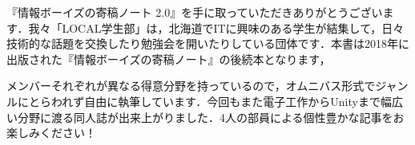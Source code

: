 『情報ボーイズの寄稿ノート 2.0』を手に取っていただきありがとうございます．我々「LOCAL学生部」は，北海道でITに興味のある学生が結集して，日々技術的な話題を交換したり勉強会を開いたりしている団体です．本書は2018年に出版された『情報ボーイズの寄稿ノート』の後続本となります，

メンバーそれぞれが異なる得意分野を持っているので，オムニバス形式でジャンルにとらわれず自由に執筆しています．今回もまた電子工作からUnityまで幅広い分野に渡る同人誌が出来上がりました．4人の部員による個性豊かな記事をお楽しみください！
